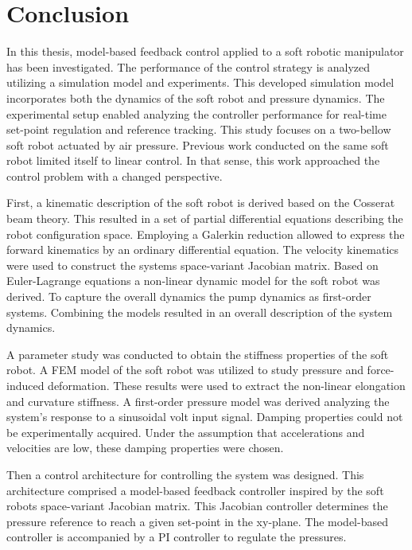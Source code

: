 \section{Conclusion}

In this thesis, model-based feedback control applied to a soft robotic manipulator has been investigated. The performance of the control strategy is analyzed utilizing a simulation model and experiments. This developed simulation model incorporates both the dynamics of the soft robot and pressure dynamics. The experimental setup enabled analyzing the controller performance for real-time set-point regulation and reference tracking. This study focuses on a two-bellow soft robot actuated by air pressure. Previous work \cite{berkers} conducted on the same soft robot limited itself to linear control. In that sense, this work approached the control problem with a changed perspective. 


First, a kinematic description of the soft robot is derived based on the Cosserat beam theory. This resulted in a set of partial differential equations describing the robot configuration space. Employing a Galerkin reduction allowed to express the forward kinematics by an ordinary differential equation. The velocity kinematics were used to construct the systems space-variant Jacobian matrix. Based on Euler-Lagrange equations a non-linear dynamic model for the soft robot was derived. To capture the overall dynamics the pump dynamics as first-order systems. Combining the models resulted in an overall description of the system dynamics. 

A parameter study was conducted to obtain the stiffness properties of the soft robot. A FEM model of the soft robot was utilized to study pressure and force-induced deformation. These results were used to extract the non-linear elongation and curvature stiffness. A first-order pressure model was derived analyzing the system's response to a sinusoidal volt input signal. Damping properties could not be experimentally acquired. Under the assumption that accelerations and velocities are low, these damping properties were chosen.

Then a control architecture for controlling the system was designed. This architecture comprised a model-based feedback controller inspired by the soft robots space-variant Jacobian matrix. This Jacobian controller determines the pressure reference to reach a given set-point in the xy-plane. The model-based controller is accompanied by a PI controller to regulate the pressures. 

